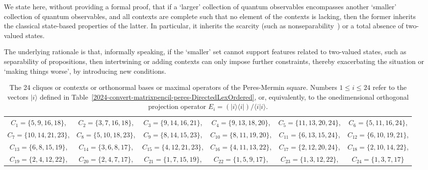 \documentclass[
  twocolumn,
 showpacs,
 showkeys,
 preprintnumbers,
 amsmath,amssymb,
 aps,
 prl,
  longbibliography,
 floatfix,
 ]{revtex4-2}
\begin{document}
We state here, without providing a formal proof, that if a `larger' collection of quantum observables encompasses another `smaller' collection of quantum observables, and all contexts are complete such that no element of the contexts is lacking, then the former inherits the classical state-based properties of the latter. In particular, it inherits the scarcity (such as nonseparability~\cite[Theorem 0]{kochen1}) or a total absence of two-valued states.

The underlying rationale is that, informally speaking, if the `smaller' set cannot support features related to two-valued states, such as separability of propositions, then intertwining or adding contexts can only impose further constraints, thereby exacerbating the situation or `making things worse', by introducing new conditions.



\begin{table*}[ht]
\caption{\label{2024-convert-matrixpencil-peres-DirectedLexOrdered-cliques}The 24 cliques or contexts or orthonormal bases or maximal operators
of the Peres-Mermin square.
Numbers $1 \le i \le 24$ refer to  the vectors $ \vert i \rangle $ defined in Table~\ref{2024-convert-matrixpencil-peres-DirectedLexOrdered},
or, equivalently, to the onedimensional orthogonal projection operator $ E_i = (\vert i \rangle \langle i \vert)/ \langle  i \vert i \rangle   $.}
\begin{ruledtabular}
\begin{tabular}{cccccc}
$ C_{ 1 } =       \big\{ 5, 9, 16, 18 \big\}  $, &
$ C_{ 2 } =       \big\{ 3, 7, 16, 18 \big\}  $, &
$ C_{ 3 } =       \big\{ 9, 14, 16, 21 \big\}  $, &
$ C_{ 4 } =       \big\{ 9, 13, 18, 20 \big\}  $, &
$ C_{ 5 } =       \big\{ 11, 13, 20, 24 \big\}  $, &
$ C_{ 6 } =       \big\{ 5, 11, 16, 24 \big\}  $,
\\
$ C_{ 7 } =       \big\{ 10, 14, 21, 23 \big\}  $, &
$ C_{ 8 } =       \big\{ 5, 10, 18, 23 \big\}  $, &
$ C_{ 9 } =       \big\{ 8, 14, 15, 23 \big\}  $, &
$ C_{ 10 } =      \big\{ 8, 11, 19, 20 \big\}  $, &
$ C_{ 11 } =      \big\{ 6, 13, 15, 24 \big\}  $, &
$ C_{ 12 } =      \big\{ 6, 10, 19, 21 \big\}  $,
\\
$ C_{ 13 } =      \big\{ 6, 8, 15, 19 \big\}  $, &
$ C_{ 14 } =      \big\{ 3, 6, 8, 17 \big\}  $, &
$ C_{ 15 } =      \big\{ 4, 12, 21, 23 \big\}  $, &
$ C_{ 16 } =      \big\{ 4, 11, 13, 22 \big\}  $, &
$ C_{ 17 } =      \big\{ 2, 12, 20, 24 \big\}  $, &
$ C_{ 18 } =      \big\{ 2, 10, 14, 22 \big\}  $,
\\
$ C_{ 19 } =      \big\{ 2, 4, 12, 22 \big\}  $, &
$ C_{ 20 } =      \big\{ 2, 4, 7, 17 \big\}  $, &
$ C_{ 21 } =     \big\{ 1, 7, 15, 19 \big\}  $, &
$ C_{ 22 } =      \big\{ 1, 5, 9, 17 \big\}  $, &
$ C_{ 23 } =      \big\{ 1, 3, 12, 22 \big\}  $, &
$ C_{ 24 } =      \big\{ 1, 3, 7, 17 \big\}  $
\end{tabular}
\end{ruledtabular}
\end{table*}
\end{document}
